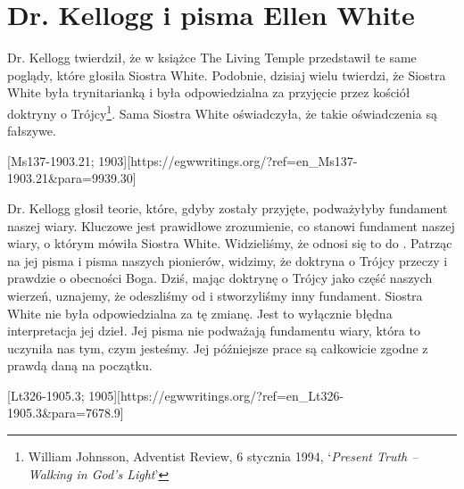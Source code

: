 \chapter{Dr. Kellogg i pisma Ellen White}

Dr. Kellogg twierdził, że w książce The Living Temple przedstawił te same poglądy, które głosiła Siostra White. Podobnie, dzisiaj wielu twierdzi, że Siostra White była trynitarianką i była odpowiedzialna za przyjęcie przez kościół doktryny o Trójcy\footnote{William Johnsson, Adventist Review, 6 stycznia 1994, ‘\textit{Present Truth –Walking in God's Light}’}. Sama Siostra White oświadczyła, że takie oświadczenia są fałszywe.

[Ms137-1903.21; 1903][https://egwwritings.org/?ref=en\_Ms137-1903.21&para=9939.30]

Dr. Kellogg głosił teorie, które, gdyby zostały przyjęte, podważyłyby fundament naszej wiary. Kluczowe jest prawidłowe zrozumienie, co stanowi fundament naszej wiary, o którym mówiła Siostra White. Widzieliśmy, że odnosi się to do . Patrząc na jej pisma i pisma naszych pionierów, widzimy, że doktryna o Trójcy przeczy  i prawdzie o obecności Boga. Dziś, mając doktrynę o Trójcy jako część naszych wierzeń, uznajemy, że odeszliśmy od  i stworzyliśmy inny fundament. Siostra White nie była odpowiedzialna za tę zmianę. Jest to wyłącznie błędna interpretacja jej dzieł. Jej pisma nie podważają fundamentu wiary, która to uczyniła nas tym, czym jesteśmy. Jej późniejsze prace są całkowicie zgodne z prawdą daną na początku.

[Lt326-1905.3; 1905][https://egwwritings.org/?ref=en\_Lt326-1905.3&para=7678.9]

